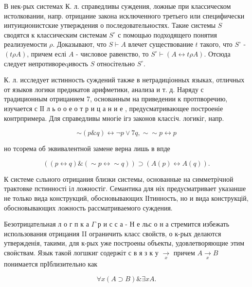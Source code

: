 \documentclass[10pt]{article}
\begin{document}
В нек-рых системах К. л. справедливы суждения, ложные при классическом истолковании, напр. отрицание закона исключенного третьего или специфически интуиционистские утверждения о последовательностях. Такие системы $S$ сводятся к классическим системам $S^{\circ}$ с помощью подходящего понятия реализуемости $\rho$. Доказывают, что $S \vdash A$ влечет существование $t$ такого, что $S^{\circ}$ - $(t \rho A)$, причем еслі $A$ - числовое равенство, то $S^{\circ} \vdash(A \leftrightarrow t \rho A)$. Отсюда следует непротивореqивость $S$ относітельно $S^{\circ}$.



К. л. исследует истинность суждений также в нетрадиціонных языках, отличных от языков логики предикатов арифметики, анализа и т. д. Наряду с традиционным отрицанием 7, основанным на приведении к протпворечию, изучается с ІІ л ь о о е о т р и ц а н и е , предусматривающее построеніе контрпримера. Для справедливы многіе ігз законов классіч. логикіг, напр.



\[

\sim(p \& q) \leftrightarrow \neg p \vee 7 q, \sim \sim p \leftrightarrow p

\]



но тсорема об эквивалентной замене верна лишь в впде



\[

((p \leftrightarrow q) \&(\sim p \leftrightarrow \sim q)) \supset(A(p) \leftrightarrow A(q)) .

\]



К системе сıльного отрицания близки системы, основанные на симметрічной трактовке пстинності іл ложностіг. Семантика для ніх предусматривает указанше не только вида конструкций, обосновывающих ІІтинность, но и вида конструкцій, обосновывающих ложность рассматриваемого суждения.



Безотрицательная л о г п к а $\Gamma$ р и с с а - Н е льс о н а стремится избежать использования отрицания II ограничить класс свойств, о к-рых делаются утвержденія, такими, для к-рых уже построены объекты, удовлетворяющие этим своӥствам. Язык такой логшкиг содержіт с в я з к у $\underset{x}{\rightarrow}$ причем $A \underset{x}{\rightarrow} B$ понимается прІблизительно как



\[

\forall x(A \supset B) \& \exists x A .

\]
\end{document}
